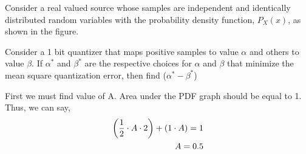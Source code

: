 \documentclass[]{article}
\begin{document}
\providecommand{\qfunc}[1]{\ensuremath{Q\left(#1\right)}}
\providecommand{\gauss}[2]{\mathcal{N}\ensuremath{\left(#1,#2\right)}}
\providecommand{\diff}[2]{\ensuremath{\frac{d{#1}}{d{#2}}}}
\providecommand{\myceil}[1]{\left \lceil #1 \right \rceil }
\newcommand\figref{Fig.~\ref}
\newcommand\tabref{Table~\ref}
\newcommand{\sinc}{\,\text{sinc}\,}
\newcommand{\rect}{\,\text{rect}\,}

\let\vec\mathbf

Consider a real valued source whose samples are independent and identically
distributed random variables with the probability density function, $P_X(x)$, as shown in
the figure.

\begin{center}
\end{center}

Consider a 1 bit quantizer that maps positive samples to value $\alpha$ and others to value
$\beta$. If $\alpha ^*$ and $\beta ^*$ are the respective choices for $\alpha$ and $\beta$ that minimize the mean square
quantization error, then find ($\alpha ^* - \beta ^*$)

\solution
First we must find value of A. Area under the PDF graph should be equal to 1. Thus, we can say,
\begin{align}
    \left(\frac{1}{2}\cdot A\cdot 2\right) + (1\cdot A) = 1 \\
    A = 0.5
\end{align}
\end{document}
